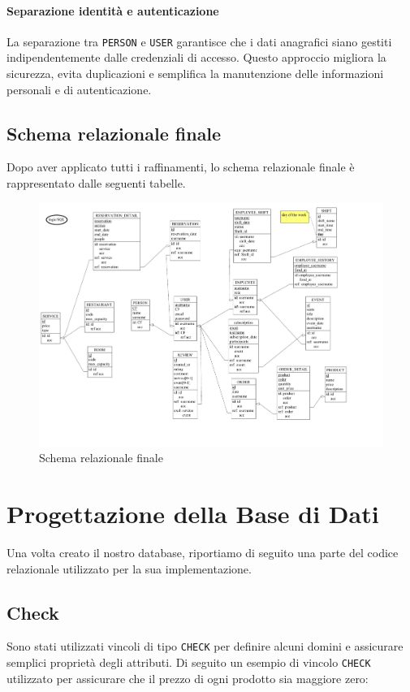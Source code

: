 \documentclass[a4paper,12pt]{report}
\begin{document}
\subsubsection{Separazione identità e autenticazione}
La separazione tra \texttt{PERSON} e \texttt{USER} garantisce che i
dati anagrafici siano gestiti indipendentemente dalle credenziali di
accesso. Questo approccio migliora la sicurezza, evita duplicazioni e
semplifica la manutenzione delle informazioni personali e di autenticazione.

\section{Schema relazionale finale}
Dopo aver applicato tutti i raffinamenti, lo schema relazionale
finale è rappresentato dalle seguenti tabelle.

\begin{figure}[H]
  \centering
  \includegraphics[width=\textwidth, trim=0 0 0 0]{./schemas/logic.pdf}
  \caption{Schema relazionale finale}
  \label{fig:schema-relazione}
\end{figure}
\newpage

\chapter{Progettazione della Base di Dati}
Una volta creato il nostro database, riportiamo di seguito una parte
del codice relazionale
utilizzato per la sua implementazione.

\section{Check}
Sono stati utilizzati vincoli di tipo \texttt{CHECK} per definire
alcuni domini e assicurare
semplici proprietà degli attributi. Di seguito un esempio di vincolo
\texttt{CHECK} utilizzato
per assicurare che il prezzo di ogni prodotto sia maggiore zero:
\end{document}
